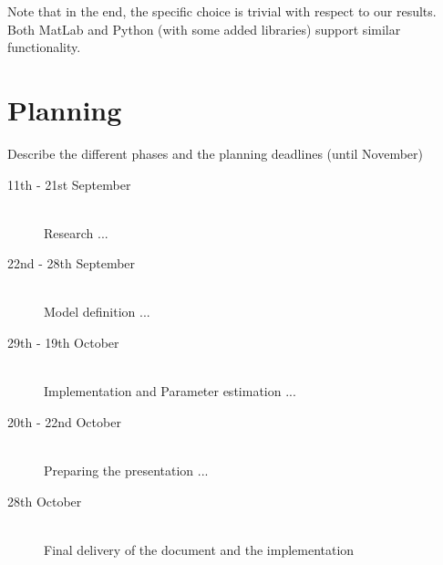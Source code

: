 \documentclass[a4paper, 11pt]{scrartcl}
\begin{document}
Note that in the end, the specific choice is trivial with respect to our results. Both MatLab and Python (with some added libraries) support similar functionality.

\section{Planning}

Describe the different phases and the planning deadlines (until November)

\begin{description}
	\item[11th - 21st September]\-\\
	Research ...
	\item[22nd - 28th September]\-\\
	Model definition ...
	\item[29th - 19th October]\-\\
	Implementation and Parameter estimation ...
	\item[20th - 22nd October]\-\\
	Preparing the presentation ...
	\item[28th October]\-\\
	Final delivery of the document and the implementation
\end{description}
\end{document}
